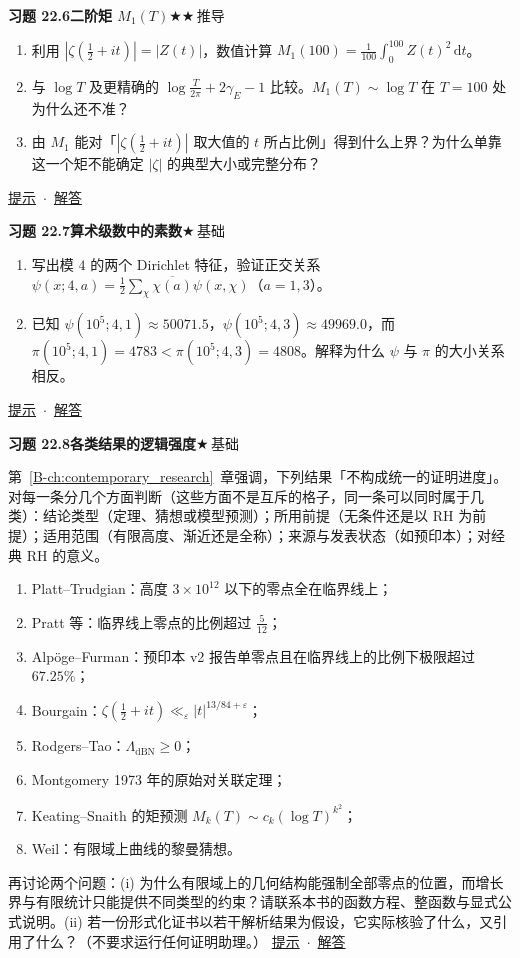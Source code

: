 \documentclass[11pt,a4paper]{article}
\newcommand{\dd}{\,\mathrm{d}}
\newcommand{\bref}[1]{\ref*{B-#1}}
\newcommand{\lvI}{$\bigstar$\,基础}
\newcommand{\lvII}{$\bigstar\bigstar$\,推导}
\newcommand{\Q}[3]{%
  \par\addvspace{1.1em}\noindent
  \hypertarget{q:#1}{}\textbf{习题 #1}\quad\textbf{#3}\hfill{\small #2}\par
  \nopagebreak\smallskip}
\newcommand{\toHint}[1]{\hfill{\small\hyperlink{h:#1}{提示}\ $\cdot$\ \hyperlink{s:#1}{解答}}}
\begin{document}
\Q{22.6}{\lvII}{二阶矩 $M_1(T)$}
\begin{enumerate}
  \item 利用 $|\zeta(\frac12+it)|=|Z(t)|$，数值计算 $M_1(100)=\frac1{100}\int_0^{100}Z(t)^2\dd t$。
  \item 与 $\log T$ 及更精确的 $\log\frac T{2\pi}+2\gamma_E-1$ 比较。$M_1(T)\sim\log T$ 在 $T=100$ 处为什么还不准？
  \item 由 $M_1$ 能对「$|\zeta(\frac12+it)|$ 取大值的 $t$ 所占比例」得到什么上界？为什么单靠这一个矩不能确定 $|\zeta|$ 的典型大小或完整分布？
\end{enumerate}
\toHint{22.6}

\Q{22.7}{\lvI}{算术级数中的素数}
\begin{enumerate}
  \item 写出模 $4$ 的两个 Dirichlet 特征，验证正交关系 $\psi(x;4,a)=\frac12\sum_\chi\overline{\chi(a)}\psi(x,\chi)$（$a=1,3$）。
  \item 已知 $\psi(10^5;4,1)\approx50071.5$，$\psi(10^5;4,3)\approx49969.0$，而 $\pi(10^5;4,1)=4783<\pi(10^5;4,3)=4808$。解释为什么 $\psi$ 与 $\pi$ 的大小关系相反。
\end{enumerate}
\toHint{22.7}

\Q{22.8}{\lvI}{各类结果的逻辑强度}
第~\bref{ch:contemporary_research}~章强调，下列结果「不构成统一的证明进度」。对每一条分几个方面判断（这些方面不是互斥的格子，同一条可以同时属于几类）：结论类型（定理、猜想或模型预测）；所用前提（无条件还是以 RH 为前提）；适用范围（有限高度、渐近还是全称）；来源与发表状态（如预印本）；对经典 RH 的意义。
\begin{enumerate}
  \item Platt--Trudgian：高度 $3\times10^{12}$ 以下的零点全在临界线上；
  \item Pratt 等：临界线上零点的比例超过 $\frac5{12}$；
  \item Alp\"oge--Furman：预印本 v2 报告单零点且在临界线上的比例下极限超过 $67.25\%$；
  \item Bourgain：$\zeta(\frac12+it)\ll_\varepsilon|t|^{13/84+\varepsilon}$；
  \item Rodgers--Tao：$\Lambda_{\mathrm{dBN}}\ge0$；
  \item Montgomery 1973 年的原始对关联定理；
  \item Keating--Snaith 的矩预测 $M_k(T)\sim c_k(\log T)^{k^2}$；
  \item Weil：有限域上曲线的黎曼猜想。
\end{enumerate}
再讨论两个问题：(i) 为什么有限域上的几何结构能强制全部零点的位置，而增长界与有限统计只能提供不同类型的约束？请联系本书的函数方程、整函数与显式公式说明。(ii) 若一份形式化证书以若干解析结果为假设，它实际核验了什么，又引用了什么？（不要求运行任何证明助理。）
\toHint{22.8}
\end{document}
